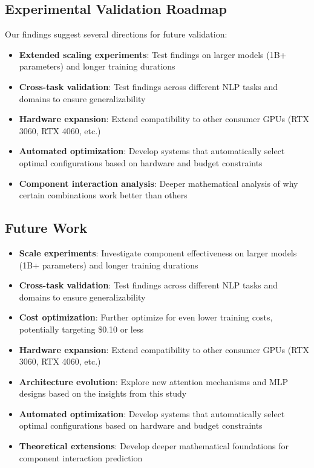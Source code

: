 \documentclass[11pt,a4paper]{article}
\begin{document}
\subsection{Experimental Validation Roadmap}

Our findings suggest several directions for future validation:

\begin{itemize}
    \item \textbf{Extended scaling experiments}: Test findings on larger models (1B+ parameters) and longer training durations
    \item \textbf{Cross-task validation}: Test findings across different NLP tasks and domains to ensure generalizability
    \item \textbf{Hardware expansion}: Extend compatibility to other consumer GPUs (RTX 3060, RTX 4060, etc.)
    \item \textbf{Automated optimization}: Develop systems that automatically select optimal configurations based on hardware and budget constraints
    \item \textbf{Component interaction analysis}: Deeper mathematical analysis of why certain combinations work better than others
\end{itemize}

\subsection{Future Work}

\begin{itemize}
    \item \textbf{Scale experiments}: Investigate component effectiveness on larger models (1B+ parameters) and longer training durations
    \item \textbf{Cross-task validation}: Test findings across different NLP tasks and domains to ensure generalizability
    \item \textbf{Cost optimization}: Further optimize for even lower training costs, potentially targeting \$0.10 or less
    \item \textbf{Hardware expansion}: Extend compatibility to other consumer GPUs (RTX 3060, RTX 4060, etc.)
    \item \textbf{Architecture evolution}: Explore new attention mechanisms and MLP designs based on the insights from this study
    \item \textbf{Automated optimization}: Develop systems that automatically select optimal configurations based on hardware and budget constraints
    \item \textbf{Theoretical extensions}: Develop deeper mathematical foundations for component interaction prediction
\end{itemize}
\end{document}

